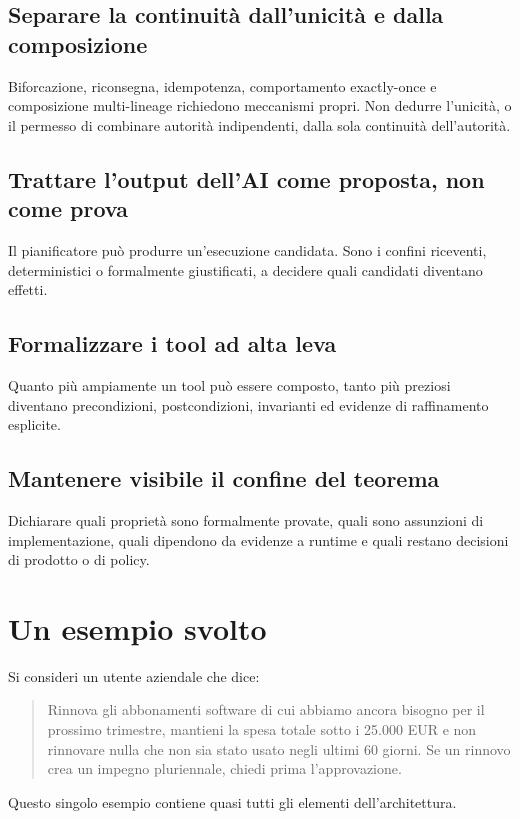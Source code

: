 \documentclass[10pt,oneside,openany]{book}
\begin{document}
\section{Separare la continuità dall'unicità e dalla composizione}
Biforcazione, riconsegna, idempotenza, comportamento exactly-once e composizione multi-lineage richiedono meccanismi propri. Non dedurre l'unicità, o il permesso di combinare autorità indipendenti, dalla sola continuità dell'autorità.

\section{Trattare l'output dell'AI come proposta, non come prova}
Il pianificatore può produrre un'esecuzione candidata. Sono i confini riceventi, deterministici o formalmente giustificati, a decidere quali candidati diventano effetti.

\section{Formalizzare i tool ad alta leva}
Quanto più ampiamente un tool può essere composto, tanto più preziosi diventano precondizioni, postcondizioni, invarianti ed evidenze di raffinamento esplicite.

\section{Mantenere visibile il confine del teorema}
Dichiarare quali proprietà sono formalmente provate, quali sono assunzioni di implementazione, quali dipendono da evidenze a runtime e quali restano decisioni di prodotto o di policy.

\chapter{Un esempio svolto}

Si consideri un utente aziendale che dice:

\begin{quote}
Rinnova gli abbonamenti software di cui abbiamo ancora bisogno per il prossimo trimestre, mantieni la spesa totale sotto i 25.000 EUR e non rinnovare nulla che non sia stato usato negli ultimi 60 giorni. Se un rinnovo crea un impegno pluriennale, chiedi prima l'approvazione.
\end{quote}

Questo singolo esempio contiene quasi tutti gli elementi dell'architettura.
\end{document}
